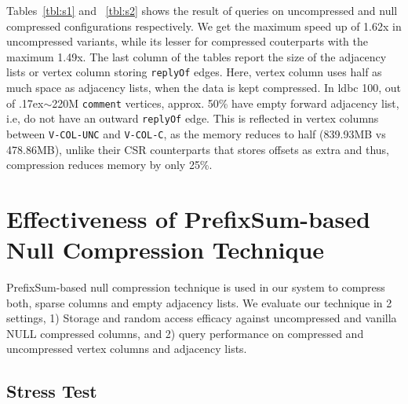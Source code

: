 Tables~\ref{tbl:s1} and ~\ref{tbl:s2} shows the result of queries on uncompressed and null compressed configurations respectively. 	We get the maximum speed up of 1.62x in uncompressed variants, while its lesser for compressed couterparts with the maximum 1.49x. The last column of the tables report the size of the adjacency lists or vertex column storing \texttt{replyOf} edges. Here, vertex column uses half as much space as adjacency lists, when the data is kept compressed. In \gls{ldbc} 100, out of {\raise.17ex\hbox{$\scriptstyle\sim$}}220M \texttt{comment} vertices, approx. 50\% have empty forward adjacency list, i.e, do not have an outward \texttt{replyOf} edge. This is reflected in vertex columns between \texttt{V-COL-UNC} and \texttt{V-COL-C}, as the memory reduces to half (839.93MB vs 478.86MB), unlike their CSR counterparts that stores offsets as extra and thus, compression reduces memory by only 25\%.

\section{Effectiveness of PrefixSum-based Null Compression Technique}
\label{exp:prefixSum}

PrefixSum-based null compression technique is used in our system to compress both, sparse columns and empty adjacency lists. We evaluate our technique in 2 settings, 1) Storage and random access efficacy against uncompressed and vanilla NULL compressed columns, and 2) query performance on compressed and uncompressed vertex columns and adjacency lists.

\subsection{Stress Test} 


